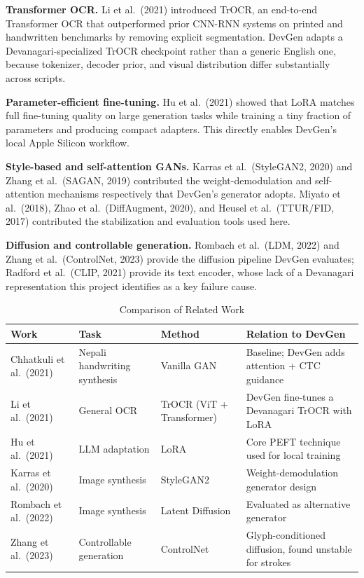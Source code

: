 \documentclass[12pt,a4paper]{report}
\begin{document}
\textbf{Transformer OCR.} Li et al.\ (2021) introduced TrOCR, an end-to-end Transformer OCR that outperformed prior CNN-RNN systems on printed and handwritten benchmarks by removing explicit segmentation. DevGen adapts a Devanagari-specialized TrOCR checkpoint rather than a generic English one, because tokenizer, decoder prior, and visual distribution differ substantially across scripts.

\textbf{Parameter-efficient fine-tuning.} Hu et al.\ (2021) showed that LoRA matches full fine-tuning quality on large generation tasks while training a tiny fraction of parameters and producing compact adapters. This directly enables DevGen's local Apple Silicon workflow.

\textbf{Style-based and self-attention GANs.} Karras et al.\ (StyleGAN2, 2020) and Zhang et al.\ (SAGAN, 2019) contributed the weight-demodulation and self-attention mechanisms respectively that DevGen's generator adopts. Miyato et al.\ (2018), Zhao et al.\ (DiffAugment, 2020), and Heusel et al.\ (TTUR/FID, 2017) contributed the stabilization and evaluation tools used here.

\textbf{Diffusion and controllable generation.} Rombach et al.\ (LDM, 2022) and Zhang et al.\ (ControlNet, 2023) provide the diffusion pipeline DevGen evaluates; Radford et al.\ (CLIP, 2021) provide its text encoder, whose lack of a Devanagari representation this project identifies as a key failure cause.

\begin{table}[htbp]
\centering
\caption{Comparison of Related Work}
\small
\begin{tabular}{p{3.2cm}p{3.4cm}p{3.2cm}p{4.4cm}}
\toprule
\textbf{Work} & \textbf{Task} & \textbf{Method} & \textbf{Relation to DevGen} \\
\midrule
Chhatkuli et al.\ (2021) & Nepali handwriting synthesis & Vanilla GAN & Baseline; DevGen adds attention + CTC guidance \\
Li et al.\ (2021) & General OCR & TrOCR (ViT + Transformer) & DevGen fine-tunes a Devanagari TrOCR with LoRA \\
Hu et al.\ (2021) & LLM adaptation & LoRA & Core PEFT technique used for local training \\
Karras et al.\ (2020) & Image synthesis & StyleGAN2 & Weight-demodulation generator design \\
Rombach et al.\ (2022) & Image synthesis & Latent Diffusion & Evaluated as alternative generator \\
Zhang et al.\ (2023) & Controllable generation & ControlNet & Glyph-conditioned diffusion, found unstable for strokes \\
\bottomrule
\end{tabular}
\end{table}
\end{document}
